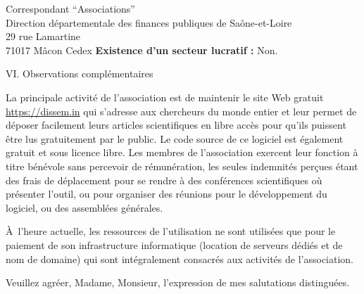 \documentclass[11pt]{lettre}
\begin{document}
\begin{letter}{Correspondant ``Associations''\\Direction départementale des
  finances publiques de Saône-et-Loire\\29 rue Lamartine\\71017 Mâcon Cedex}
  \textbf{Existence d'un secteur lucratif :} Non.

  {\Large VI. Observations complémentaires}

  La principale activité de l'association est de maintenir le site Web gratuit
  \url{https://dissem.in} qui s'adresse aux chercheurs du monde entier et leur
  permet de déposer facilement leurs articles scientifiques en libre accès pour
  qu'ils puissent être lus gratuitement par le public. Le code source de ce
  logiciel est également gratuit et sous licence libre. Les membres de
  l'association exercent leur fonction à titre bénévole sans percevoir de
  rémunération, les seules indemnités perçues étant des frais de déplacement
  pour se rendre à des conférences scientifiques où présenter l'outil, ou pour
  organiser des réunions pour le développement du logiciel, ou des assemblées
  générales.

  À l'heure actuelle, les ressources de l'utilisation ne sont utilisées que pour
  le paiement de son infrastructure informatique (location de serveurs dédiés et
  de nom de domaine) qui sont intégralement consacrés aux activités de
  l'association.

  Veuillez agréer, Madame, Monsieur, l'expression de mes salutations distinguées.

\vspace{2cm}

\hspace{10cm}\begin{minipage}{6cm}
\fromname{}
\end{minipage}

\thispagestyle{empty}
\end{letter}
\end{document}
